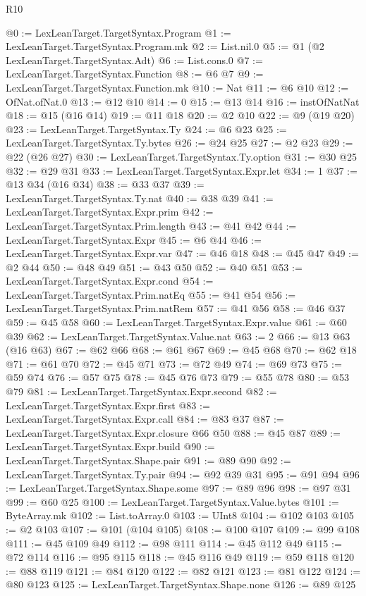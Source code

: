 \begin{lexlean}{R10}
\begin{coremodule}
@0 := LexLeanTarget.TargetSyntax.Program
@1 := LexLeanTarget.TargetSyntax.Program.mk
@2 := List.nil.{0}
@5 := @1 (@2 LexLeanTarget.TargetSyntax.Adt)
@6 := List.cons.{0}
@7 := LexLeanTarget.TargetSyntax.Function
@8 := @6 @7
@9 := LexLeanTarget.TargetSyntax.Function.mk
@10 := Nat
@11 := @6 @10
@12 := OfNat.ofNat.{0}
@13 := @12 @10
@14 := 0
@15 := @13 @14
@16 := instOfNatNat
@18 := @15 (@16 @14)
@19 := @11 @18
@20 := @2 @10
@22 := @9 (@19 @20)
@23 := LexLeanTarget.TargetSyntax.Ty
@24 := @6 @23
@25 := LexLeanTarget.TargetSyntax.Ty.bytes
@26 := @24 @25
@27 := @2 @23
@29 := @22 (@26 @27)
@30 := LexLeanTarget.TargetSyntax.Ty.option
@31 := @30 @25
@32 := @29 @31
@33 := LexLeanTarget.TargetSyntax.Expr.let
@34 := 1
@37 := @13 @34 (@16 @34)
@38 := @33 @37
@39 := LexLeanTarget.TargetSyntax.Ty.nat
@40 := @38 @39
@41 := LexLeanTarget.TargetSyntax.Expr.prim
@42 := LexLeanTarget.TargetSyntax.Prim.length
@43 := @41 @42
@44 := LexLeanTarget.TargetSyntax.Expr
@45 := @6 @44
@46 := LexLeanTarget.TargetSyntax.Expr.var
@47 := @46 @18
@48 := @45 @47
@49 := @2 @44
@50 := @48 @49
@51 := @43 @50
@52 := @40 @51
@53 := LexLeanTarget.TargetSyntax.Expr.cond
@54 := LexLeanTarget.TargetSyntax.Prim.natEq
@55 := @41 @54
@56 := LexLeanTarget.TargetSyntax.Prim.natRem
@57 := @41 @56
@58 := @46 @37
@59 := @45 @58
@60 := LexLeanTarget.TargetSyntax.Expr.value
@61 := @60 @39
@62 := LexLeanTarget.TargetSyntax.Value.nat
@63 := 2
@66 := @13 @63 (@16 @63)
@67 := @62 @66
@68 := @61 @67
@69 := @45 @68
@70 := @62 @18
@71 := @61 @70
@72 := @45 @71
@73 := @72 @49
@74 := @69 @73
@75 := @59 @74
@76 := @57 @75
@78 := @45 @76 @73
@79 := @55 @78
@80 := @53 @79
@81 := LexLeanTarget.TargetSyntax.Expr.second
@82 := LexLeanTarget.TargetSyntax.Expr.first
@83 := LexLeanTarget.TargetSyntax.Expr.call
@84 := @83 @37
@87 := LexLeanTarget.TargetSyntax.Expr.closure @66 @50
@88 := @45 @87
@89 := LexLeanTarget.TargetSyntax.Expr.build
@90 := LexLeanTarget.TargetSyntax.Shape.pair
@91 := @89 @90
@92 := LexLeanTarget.TargetSyntax.Ty.pair
@94 := @92 @39 @31
@95 := @91 @94
@96 := LexLeanTarget.TargetSyntax.Shape.some
@97 := @89 @96
@98 := @97 @31
@99 := @60 @25
@100 := LexLeanTarget.TargetSyntax.Value.bytes
@101 := ByteArray.mk
@102 := List.toArray.{0}
@103 := UInt8
@104 := @102 @103
@105 := @2 @103
@107 := @101 (@104 @105)
@108 := @100 @107
@109 := @99 @108
@111 := @45 @109 @49
@112 := @98 @111
@114 := @45 @112 @49
@115 := @72 @114
@116 := @95 @115
@118 := @45 @116 @49
@119 := @59 @118
@120 := @88 @119
@121 := @84 @120
@122 := @82 @121
@123 := @81 @122
@124 := @80 @123
@125 := LexLeanTarget.TargetSyntax.Shape.none
@126 := @89 @125

\end{coremodule}
\end{lexlean}
